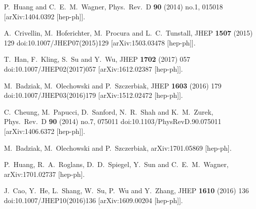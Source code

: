 \documentclass[12pt,twoside]{article}
\begin{document}
\begin{thebibliography}{99}
 

 
  P.~Huang and C.~E.~M.~Wagner,
  Phys.\ Rev.\ D {\bf 90} (2014) no.1,  015018
  [arXiv:1404.0392 [hep-ph]].
  
  A.~Crivellin, M.~Hoferichter, M.~Procura and L.~C.~Tunstall,
  JHEP {\bf 1507} (2015) 129
  doi:10.1007/JHEP07(2015)129
  [arXiv:1503.03478 [hep-ph]].
  
  T.~Han, F.~Kling, S.~Su and Y.~Wu,
  JHEP {\bf 1702} (2017) 057
  doi:10.1007/JHEP02(2017)057
  [arXiv:1612.02387 [hep-ph]].

  M.~Badziak, M.~Olechowski and P.~Szczerbiak,
  JHEP {\bf 1603} (2016) 179
  doi:10.1007/JHEP03(2016)179
  [arXiv:1512.02472 [hep-ph]].

  C.~Cheung, M.~Papucci, D.~Sanford, N.~R.~Shah and K.~M.~Zurek,
  Phys.\ Rev.\ D {\bf 90} (2014) no.7,  075011
  doi:10.1103/PhysRevD.90.075011
  [arXiv:1406.6372 [hep-ph]].
 
  M.~Badziak, M.~Olechowski and P.~Szczerbiak,
  arXiv:1701.05869 [hep-ph].

  P.~Huang, R.~A.~Roglans, D.~D.~Spiegel, Y.~Sun and C.~E.~M.~Wagner,
  arXiv:1701.02737 [hep-ph].
 
  J.~Cao, Y.~He, L.~Shang, W.~Su, P.~Wu and Y.~Zhang,
  JHEP {\bf 1610} (2016) 136
  doi:10.1007/JHEP10(2016)136
  [arXiv:1609.00204 [hep-ph]].


\end{thebibliography}
\end{document}
